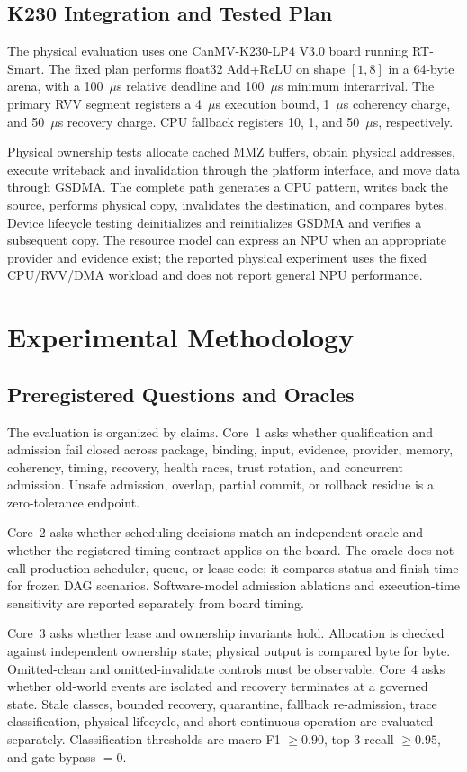 \documentclass[lettersize,journal]{IEEEtran}
\begin{document}
\subsection{K230 Integration and Tested Plan}
The physical evaluation uses one CanMV-K230-LP4 V3.0 board running RT-Smart.
The fixed plan performs float32 Add+ReLU on shape $[1,8]$ in a 64-byte arena,
with a 100~$\mu$s relative deadline and 100~$\mu$s minimum interarrival. The
primary RVV segment registers a 4~$\mu$s execution bound, 1~$\mu$s coherency
charge, and 50~$\mu$s recovery charge. CPU fallback registers 10, 1, and
50~$\mu$s, respectively.

Physical ownership tests allocate cached MMZ buffers, obtain physical
addresses, execute writeback and invalidation through the platform interface,
and move data through GSDMA. The complete path generates a CPU pattern, writes
back the source, performs physical copy, invalidates the destination, and
compares bytes. Device lifecycle testing deinitializes and reinitializes GSDMA
and verifies a subsequent copy. The resource model can express an NPU when an
appropriate provider and evidence exist; the reported physical experiment uses
the fixed CPU/RVV/DMA workload and does not report general NPU performance.

\section{Experimental Methodology}
\subsection{Preregistered Questions and Oracles}
The evaluation is organized by claims. Core~1 asks whether qualification and
admission fail closed across package, binding, input, evidence, provider,
memory, coherency, timing, recovery, health races, trust rotation, and
concurrent admission. Unsafe admission, overlap, partial commit, or rollback
residue is a zero-tolerance endpoint.

Core~2 asks whether scheduling decisions match an independent oracle and
whether the registered timing contract applies on the board. The oracle does
not call production scheduler, queue, or lease code; it compares status and
finish time for frozen DAG scenarios. Software-model admission ablations and
execution-time sensitivity are reported separately from board timing.

Core~3 asks whether lease and ownership invariants hold. Allocation is checked
against independent ownership state; physical output is compared byte for byte.
Omitted-clean and omitted-invalidate controls must be observable. Core~4 asks
whether old-world events are isolated and recovery terminates at a governed
state. Stale classes, bounded recovery, quarantine, fallback re-admission,
trace classification, physical lifecycle, and short continuous operation are
evaluated separately. Classification thresholds are macro-F1 $\ge0.90$,
top-3 recall $\ge0.95$, and gate bypass $=0$.
\end{document}
